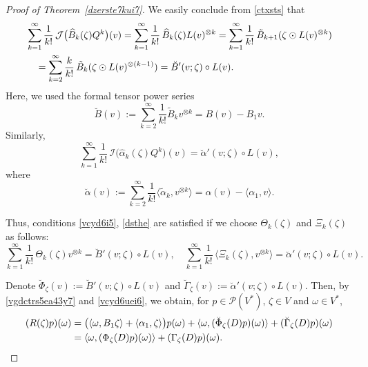 \documentclass[10pt,a4paper]{amsart}
\begin{document}
\begin{proof}[Proof of Theorem~\ref{dzerste7kui7}]
We easily conclude from \eqref{ctxsts} that 
\begin{align}
&\sum_{k=1}^\infty \frac 1{k!}\,\mathcal J\big(\widehat B_{k}(\zeta) Q^{k}\big)(v)=
\sum_{k=1}^\infty \frac 1{k!}\,\widehat B_{k}(\zeta) L(v)^{\otimes k}
=\sum_{k=1}^\infty \frac 1{k!}\,\tilde B_{k+1}(\zeta\odot L(v)^{\otimes k})\notag\\
&\quad= \sum_{k=2}^\infty\frac{k}{k!}\,\tilde B_k(\zeta\odot L(v)^{\otimes(k-1)})=\breve B'(v;\zeta)\circ L(v). \label{vftr6e645}
\end{align}
Here, we used the formal tensor power series 
$$\breve B(v):=\sum_{k=2}^\infty \frac1{k!}\tilde B_kv^{\otimes k}=B(v)-B_1v.$$ 
Similarly,
\begin{equation}
\sum_{k=1}^\infty \frac 1{k!}\,\mathcal I\big(\widehat \alpha_{k}(\zeta) Q^{k}\big)(v)=\breve \alpha'(v;\zeta)\circ L(v),
\label{ryd6ue5i7}
\end{equation}
where 
$$\breve \alpha (v):=\sum_{k=2}^\infty \frac1{k!}\langle \tilde \alpha _k,v^{\otimes k}\rangle=\alpha(v)-\langle \alpha_1,v\rangle.$$ 

Thus, conditions \eqref{vcyd6i5}, \eqref{dsthe} are satisfied if we choose $\Theta_k(\zeta)$ and $\Xi_k(\zeta)$ as follows:
\begin{equation}\label{vcyd6uei6}
\sum_{k=1}^\infty \frac 1{k!}\,  \Theta_k(\zeta) v^{\otimes k}=\breve B'(v;\zeta)\circ L(v),\quad \sum_{k=1}^\infty \frac 1{k!}\,  \langle \Xi_k(\zeta), v^{\otimes k}\rangle=\breve\alpha'(v;\zeta)\circ L(v).\end{equation}

 Denote $\breve\Phi_\zeta(v):=\breve B'(v;\zeta)\circ L(v)$ and $\breve\Gamma_\zeta(v):=\breve \alpha'(v;\zeta)\circ L(v)$. Then, by \eqref{vgdctrs5ea43y7} and \eqref{vcyd6uei6}, we obtain, for 
 $p\in\mathcal P(V^*)$, $\zeta\in V$ and $\omega\in V^*$,
\begin{align*}
(R(\zeta)p)(\omega)&=\big(\langle\omega, B_1\zeta\rangle
+\langle\alpha_1,\zeta\rangle\big)p(\omega)+\langle\omega,(\breve\Phi_\zeta(D)p)(\omega)\rangle+(\breve\Gamma_\zeta(D)p)(\omega)\\
&=\langle\omega,(\Phi_\zeta(D)p)(\omega)\rangle+(\Gamma_\zeta(D)p)(\omega).\qedhere
\end{align*}
\end{proof}
\end{document}
